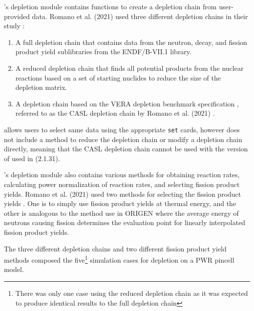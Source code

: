 \OpenMC's depletion module contains functions to create a depletion chain from
user-provided data. Romano et al. (2021) used three different depletion chains
in their study \cite{romano_depletion_2021}:
\begin{enumerate}
    \item A full depletion chain that contains data from the neutron, decay,
        and fission product yield sublibraries from the ENDF/B-VII.1 library.
    \item A reduced depletion chain that finds all potential products from the
        nuclear reactions based on a set of starting nuclides to reduce the
        size of the depletion matrix.
    \item A depletion chain based on the VERA depletion benchmark
        specification \cite{kim_specification_2015}, referred to as the CASL
        depletion chain by Romano et al. (2021) \cite{romano_depletion_2021}.
\end{enumerate}
\SerpentTWO allows users to select same data using the appropriate \verb,set,
cards, however does not include a method to reduce the depletion chain or
modify a depletion chain directly, meaning that the CASL depletion chain cannot
be used with the version of \SerpentTWO used in \cite{romano_depletion_2021}
(2.1.31).

\OpenMC's depletion module also contains various methods for obtaining reaction
rates, calculating power normalization of reaction rates, and selecting fission
product yields. Romano et al. (2021) used two methods  for selecting the fission
product yields \cite{romano_depletion_2021}. One is to simply use fission product
yields at thermal energy, and the other is analogous to the method use in
ORIGEN \cite{gauld_isotopic_2011} where the average energy of neutrons causing
fission determines the evaluation point for linearly interpolated fission
product yields.

The three different depletion chains and two different fission product yield
methods composed the five\footnote{There was only one case using the reduced
depletion chain as it was expected to produce identical results to the full
depletion chain} simulation cases for depletion on a PWR pincell model.

